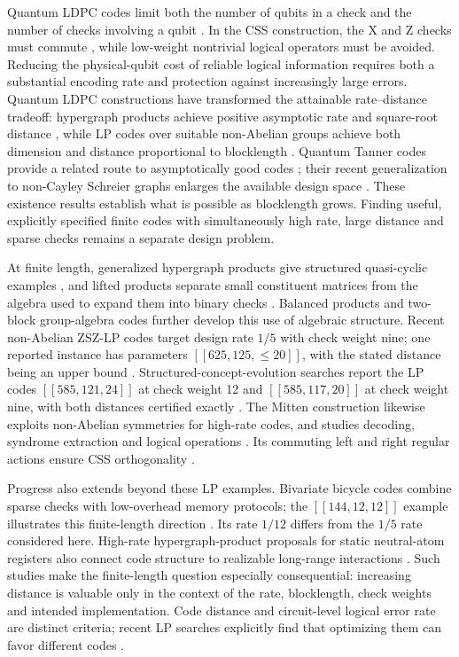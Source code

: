 \documentclass[12pt]{article}
\begin{document}
Quantum LDPC codes limit both the number of qubits in a check and the
number of checks involving a qubit \cite{sparse}. In the CSS construction,
the X and Z checks must commute \cite{css,steane}, while low-weight
nontrivial logical operators must be avoided. Reducing the physical-qubit cost of reliable logical information requires
both a substantial encoding rate and protection against increasingly
large errors. Quantum LDPC constructions have transformed the attainable
rate--distance tradeoff: hypergraph products achieve positive asymptotic
rate and square-root distance \cite{hgp}, while LP codes over suitable
non-Abelian groups achieve both dimension and distance proportional to
blocklength \cite{good}. Quantum Tanner codes provide a related route to
asymptotically good codes \cite{tanner}; their recent generalization to
non-Cayley Schreier graphs enlarges the available design space
\cite{generalizedtanner}. These existence results establish what is possible
as blocklength grows. Finding useful, explicitly specified finite codes
with simultaneously high rate, large distance and sparse checks remains
a separate design problem.

At finite length, generalized hypergraph products give structured
quasi-cyclic examples \cite[Sec.~5]{finite}, and lifted products separate
small constituent matrices from the algebra used to expand them into
binary checks \cite[Sec.~III]{lp}. Balanced products \cite{balanced} and
two-block group-algebra codes \cite{twoblock} further develop this use of
algebraic structure. Recent non-Abelian ZSZ-LP codes target design rate
$1/5$ with check weight nine; one reported instance has parameters
$[[625,125,\leq 20]]$, with the stated distance being an upper bound
\cite[Table~8]{zsz}. Structured-concept-evolution searches report the LP
codes $[[585,121,24]]$ at check weight 12 and $[[585,117,20]]$ at check
weight nine, with both distances certified exactly
\cite[Sec.~II and Supplemental Material S4--S5]{sce}.
The Mitten construction likewise exploits non-Abelian symmetries for
high-rate codes, and studies decoding, syndrome extraction and logical
operations \cite{mitten}. Its commuting left and right regular actions
ensure CSS orthogonality \cite[Appendix A.B--C]{mitten}.

Progress also extends beyond these LP examples. Bivariate bicycle codes
combine sparse checks with low-overhead memory protocols; the
$[[144,12,12]]$ example illustrates this finite-length direction
\cite{bicycle}. Its rate $1/12$ differs from the $1/5$ rate considered here.
High-rate hypergraph-product proposals for static neutral-atom registers
also connect code structure to realizable long-range interactions
\cite{neutral}. Such studies make the finite-length question especially
consequential: increasing distance is valuable only in the context of the
rate, blocklength, check weights and intended implementation.
Code distance and circuit-level logical error rate are distinct criteria;
recent LP searches explicitly find that optimizing them can favor
different codes \cite{sce}.
\end{document}

